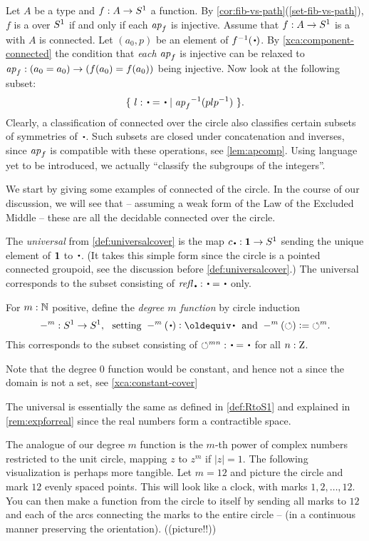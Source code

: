 Let $A$ be a type and $f:A\to {S^1}$ a function.
By \cref{cor:fib-vs-path}(\ref{set-fib-vs-path}), $f$ is a \covering
over ${S^1}$ if and only if each $\mathop{{\it ap}_{f}}$ is injective.
Assume that $f:A\to {S^1}$ is a \covering with $A$ is connected.
Let $(a_0,p)$ be an element of $f^{-1}(\base)$. 
By \cref{xca:component-connected}
the condition that \emph{each} $\mathop{{\it ap}_{f}}$ is injective
can be relaxed to $\mathop{{\it ap}_{f}}: (a_0=a_0)\to(f(a_0)=f(a_0))$ being injective.
Now look at the following subset:
\[
\set{~ l: \base = \base \mid {\ap{f}}^{-1}(plp^{-1})~ }.
\]
Clearly, a classification of connected \coverings over the circle
also classifies certain subsets of symmetries of $\base$.
Such subsets are closed under concatenation and inverses,
since $\mathop{{\it ap}_{f}}$ is compatible with these operations,
see \cref{lem:apcomp}.
Using language yet to be introduced, we actually ``classify the subgroups of the integers''.

We start by giving some examples of connected \coverings of the circle.
In the course of our discussion, we will see that -- assuming a weak form
of the Law of the Excluded Middle -- these are all the decidable connected 
\coverings over the circle.

\begin{example}\label{exa:univS1cover}
The \emph{universal} \covering from \cref{def:universalcover}
is the map $c_\base:\bn 1\to \Sc$ 
sending the unique element of $\mathbf{1}$ to $\base$. 
(It takes this simple form since the circle is a pointed connected
groupoid, see the discussion before \cref{def:universalcover}.)
The universal \covering corresponds to the subset consisting 
of $\refl\base : \base=\base$ only.  
\end{example}

\begin{example}\label{exa:mfoldS1cover}
For $m:\mathbb{N}$ positive, define the \emph{degree $m$ function} by circle induction
\[
-^m:\Sc\to \Sc, \text{~~setting~} 
-^m(\base)\defeq\base \text{~~and~} 
-^m(\Sloop)\defis{\Sloop}^m.
\]
This \covering corresponds to the subset consisting 
of ${\Sloop}^{mn} : \base=\base$ for all $n:\mathrm{Z}$.
\end{example}

Note that the degree $0$ function would be constant,
and hence not a \covering since the domain is not a set,
see \cref{xca:constant-cover}

\begin{remark}
  \label{rem:RtoS1}
The universal \covering is essentially the same as defined in \cref{def:RtoS1}
and explained in \cref{rem:expforreal}
since the real numbers form a contractible space.

\label{rem:finitecoveringsofS1}
The analogue of our degree $m$ function is the $m$-th power of complex numbers 
restricted to the unit circle, mapping $z$ to $z^m$ if $|z|=1$.  
The following visualization is perhaps more tangible.  
Let $m=12$ and picture the circle and mark $12$ evenly spaced points.
This will look like a clock, with marks $1,2,\dots,12$. 
You can then make a function from the circle to itself by sending 
all marks to $12$ and each of the arcs connecting the marks to the entire circle 
-- (in a continuous manner preserving the orientation).
  ((picture!!))
\end{remark}

